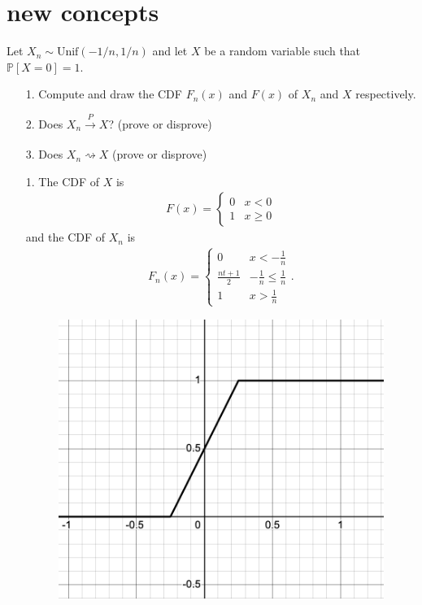 \documentclass[a4paper]{article}
\begin{document}
\section{new concepts}
\begin{Exercise}
	Let $X_n \sim \text{Unif}(-1/n, 1/n)$ and let $X$ be a random variable such that $\mathbb{P}[X = 0] = 1.$
	\begin{itemize}
		\item[1.] Compute and draw the CDF $F_n(x)$ and $F(x)$ of $X_n$ and $X$ respectively.
		\item[2.] Does $X_n \xrightarrow[]{P} X$? (prove or disprove)
		\item[3.] Does $X_n \rightsquigarrow X$ (prove or disprove)
	\end{itemize}
\end{Exercise}
\begin{Solution}
	\begin{itemize}
		\item[1.] The CDF of $X$ is \begin{align*} F(x) = 
				\begin{cases}
					0 & x < 0 \\ 
					1 & x \ge 0
				\end{cases}
			\end{align*}
			and the CDF of $X_n$ is
			\begin{align*}
				F_n(x) = \begin{cases}
					0 & x < -\frac{1}{n} \\
					\frac{nt + 1}{2} & -\frac{1}{n} \le \frac{1}{n} \\
					1 & x> \frac{1}{n}
				\end{cases}.
			\end{align*}
		\begin{figure}[hbt!]
			\centering
			\includegraphics[scale=0.3]{f1}

\end{figure}
\end{itemize}
\end{Solution}
\end{document}
